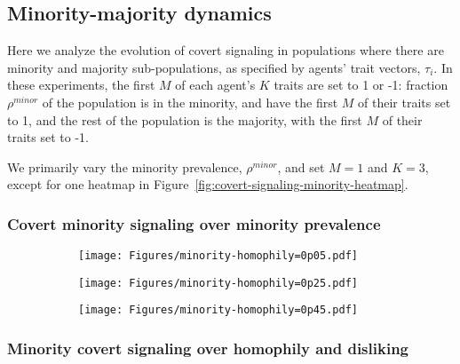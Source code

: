 \documentclass[11pt,letterpaper]{article}
\begin{document}
\subsection{Minority-majority dynamics}

Here we analyze the evolution of covert signaling in populations where there
are minority and majority sub-populations, as specified by agents' trait
vectors, $\tau_i$. In these experiments, the first $M$ of each agent's $K$ traits
are set to 1 or -1: fraction $\rho^{minor}$ of the
population is in the minority, and have the first $M$ of their traits set to
1, and the rest of the population is the majority, with the first $M$ of their
traits set to -1. 

We primarily vary the minority prevalence, $\rho^{minor}$, and set $M=1$ and
$K=3$, except for one heatmap in 
Figure~\ref{fig:covert-signaling-minority-heatmap}. 

\subsubsection{Covert minority signaling over minority prevalence}

\begin{figure}[H]
  \centering
  \begin{subfigure}{0.31\textwidth}
    \texttt{[image: Figures/minority-homophily=0p05.pdf]}
    \caption{}
  \end{subfigure}
  \begin{subfigure}{0.31\textwidth}
    \texttt{[image: Figures/minority-homophily=0p25.pdf]}
    \caption{}
  \end{subfigure}
  \begin{subfigure}{0.31\textwidth}
    \texttt{[image: Figures/minority-homophily=0p45.pdf]}
    \caption{}
  \end{subfigure}
  \caption{}
\end{figure}


\subsubsection{Minority covert signaling over homophily and disliking}
\end{document}
